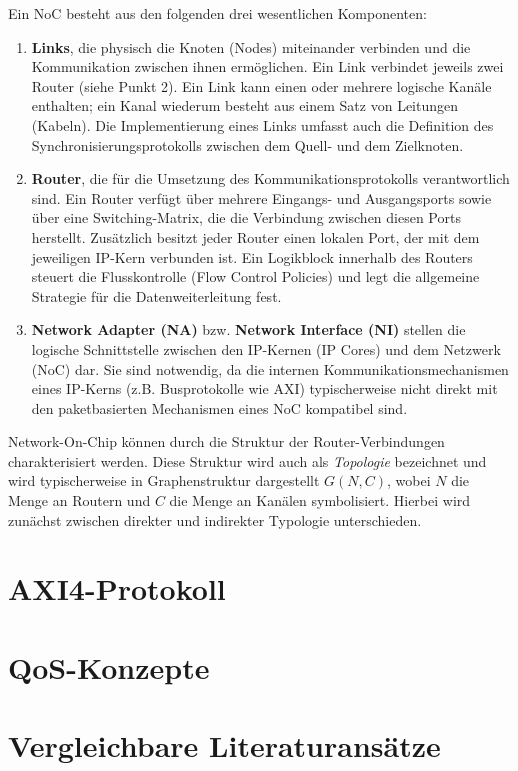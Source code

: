 Ein NoC besteht aus den folgenden drei wesentlichen Komponenten:
\begin{enumerate}
    \item \textbf{Links}, die physisch die Knoten (Nodes) miteinander verbinden und die Kommunikation zwischen ihnen ermöglichen. Ein Link verbindet jeweils zwei Router (siehe Punkt 2). Ein Link kann einen oder mehrere logische Kanäle enthalten; ein Kanal wiederum besteht aus einem Satz von Leitungen (Kabeln). Die Implementierung eines Links umfasst auch die Definition des Synchronisierungsprotokolls zwischen dem Quell- und dem Zielknoten.
    \item \textbf{Router}, die für die Umsetzung des Kommunikationsprotokolls verantwortlich sind. Ein Router verfügt über mehrere Eingangs- und Ausgangsports sowie über eine Switching-Matrix, die die Verbindung zwischen diesen Ports herstellt. Zusätzlich besitzt jeder Router einen lokalen Port, der mit dem jeweiligen IP-Kern verbunden ist. Ein Logikblock innerhalb des Routers steuert die Flusskontrolle (Flow Control Policies) und legt die allgemeine Strategie für die Datenweiterleitung fest.
    \item \textbf{Network Adapter (NA)} bzw. \textbf{Network Interface (NI)} stellen die logische Schnittstelle zwischen den IP-Kernen (IP Cores) und dem Netzwerk (NoC) dar. Sie sind notwendig, da die internen Kommunikationsmechanismen eines IP-Kerns (z.B. Busprotokolle wie AXI) typischerweise nicht direkt mit den paketbasierten Mechanismen eines NoC kompatibel sind.
\end{enumerate}

Network-On-Chip können durch die Struktur der Router-Verbindungen charakterisiert werden. Diese Struktur wird auch als \textit{Topologie} bezeichnet und wird typischerweise in Graphenstruktur dargestellt $G(N,C)$, wobei $N$ die Menge an Routern und $C$ die Menge an Kanälen symbolisiert.
Hierbei wird zunächst zwischen direkter und indirekter Typologie unterschieden.

\section{AXI4-Protokoll}

\section{QoS-Konzepte}

\section{Vergleichbare Literaturansätze}
